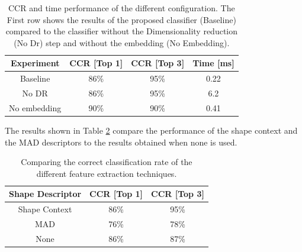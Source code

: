 \documentclass[10pt, conference, compsocconf]{IEEEtran}
\begin{document}
\begin{table}
\centering
\begin{tabular}{ | c | c | c | c |}
  \hline
  Experiment  & CCR [Top 1]  & CCR [Top 3] & Time [ms]\\
  \hline                 
  Baseline & 86\% & 95\% & 0.22 \\
  \hline
  No DR & 86\% & 95\% & 6.2 \\ 
  \hline
  No embedding & 90\% &  90\% & 0.41 \\
  \hline
\end{tabular}
\caption{CCR and time performance of the different configuration. 
The First row shows the results of the proposed classifier (Baseline) compared to the classifier without the Dimensionality reduction (No Dr) step and without the embedding (No Embedding).}
\label{table:dr_embedding_comparison} 
\end{table}

The results shown in Table \ref{table:features_comparison} compare the performance of the shape context and the MAD descriptors to the results obtained when none is used.

\begin{table}
\centering
\begin{tabular}{ | c | c | c |}
\hline
	Shape Descriptor  & CCR [Top 1]  & CCR [Top 3] \\
	\hline 
	Shape Context & 86\% & 95\%  \\                
  	\hline
  	MAD & 76\% & 78\% \\
  	\hline
  	None & 86\% &  87\% \\
  	\hline
\end{tabular}
\caption{Comparing the correct classification rate of the different feature extraction techniques.}
\label{table:features_comparison} 
\end{table}
\end{document}

